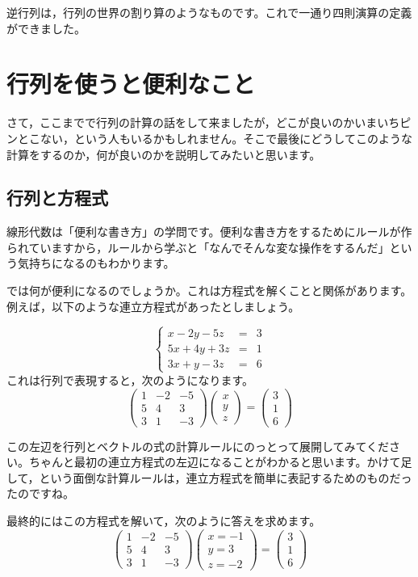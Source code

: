 \documentclass{ltjsbook}
\begin{document}
逆行列は，行列の世界の割り算のようなものです。これで一通り四則演算の定義ができました。

\section{行列を使うと便利なこと}
\label{MatrixAndEauqtion}
さて，ここまでで行列の計算の話をして来ましたが，どこが良いのかいまいちピンとこない，という人もいるかもしれません。そこで最後にどうしてこのような計算をするのか，何が良いのかを説明してみたいと思います。
\subsection{行列と方程式}
線形代数は「便利な書き方」の学問です。便利な書き方をするためにルールが作られていますから，ルールから学ぶと「なんでそんな変な操作をするんだ」という気持ちになるのもわかります。

では何が便利になるのでしょうか。これは方程式を解くことと関係があります。
例えば，以下のような連立方程式があったとしましょう。

\[ 
\left \{
					\begin{array}{lcl}
					x-2y-5z&=&3\\
					5x+4y+3z&=&1\\
					3x+y-3z&=&6
					\end{array}
					\right .
\]
                    これは行列で表現すると，次のようになります。
\[
\begin{pmatrix} 1 & -2 & -5 \\
				5 &  4 &  3 \\
				3 &  1 & -3 \end{pmatrix}
\begin{pmatrix} x \\ y \\ z \end{pmatrix}
=
\begin{pmatrix} 3 \\ 1 \\ 6 \end{pmatrix}
\]

この左辺を行列とベクトルの式の計算ルールにのっとって展開してみてください。ちゃんと最初の連立方程式の左辺になることがわかると思います。かけて足して，という面倒な計算ルールは，連立方程式を簡単に表記するためのものだったのですね。

最終的にはこの方程式を解いて，次のように答えを求めます。
\[
\begin{pmatrix} 1 & -2 & -5 \\
				5 &  4 &  3 \\
				3 &  1 & -3 \end{pmatrix}
\begin{pmatrix} x=-1 \\ y=3 \\ z=-2 \end{pmatrix}
=
\begin{pmatrix} 3 \\ 1 \\ 6 \end{pmatrix}
\]
\end{document}

